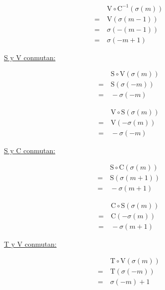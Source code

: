 \begin{center}
\begin{multicols}{3}
			\begin{align*}
			&\ \text{V}\circ\text{C}^{-1}(\sigma(m))\\
			=&\ \text{V}(\sigma(m-1))\\
			=&\ \sigma(-(m-1))\\
			=&\ \sigma(-m+1)
			\end{align*}
		\end{multicols}
		
		\underline{S y V conmutan:}
		\vspace*{-\bigskipamount}
		\begin{multicols}{2}
			\begin{align*}
			&\ \text{S}\circ\text{V}(\sigma(m))\\
			=&\ \text{S}(\sigma(-m))\\
			=&\ -\sigma(-m)
			\end{align*}
			
			\begin{align*}
			&\ \text{V}\circ\text{S}(\sigma(m))\\
			=&\ \text{V}(-\sigma(m))\\
			=&\ -\sigma(-m)
			\end{align*}
		\end{multicols}
		
		\underline{S y C conmutan:}
		\vspace*{-\bigskipamount}
		\begin{multicols}{2}
			\begin{align*}
			&\ \text{S}\circ\text{C}(\sigma(m))\\
			=&\ \text{S}(\sigma(m+1))\\
			=&\ -\sigma(m+1)
			\end{align*}
			
			\begin{align*}
			&\ \text{C}\circ\text{S}(\sigma(m))\\
			=&\ \text{C}(-\sigma(m))\\
			=&\ -\sigma(m+1)
			\end{align*}
		\end{multicols}
	
		\underline{T y V conmutan:}
		\vspace*{-\bigskipamount}
		\begin{multicols}{2}
			\begin{align*}
			&\ \text{T}\circ\text{V}(\sigma(m))\\
			=&\ \text{T}(\sigma(-m))\\
			=&\ \sigma(-m)+1
			\end{align*}
			

\end{multicols}
\end{center}
